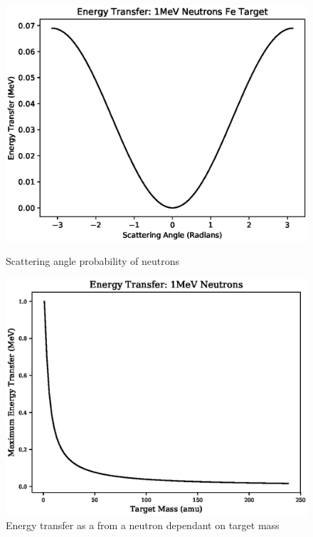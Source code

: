 \begin{figure}
\centering
\begin{minipage}{.46\textwidth}
\centering
\includegraphics[width=.9\linewidth]{chapters/austenitic_steels_in_nuclear/plots/scattering_angle.eps}
\caption{Scattering angle probability of neutrons}
\label{fig:scatteringangle}
\end{minipage}
\begin{minipage}{.05\textwidth}
\end{minipage}
\begin{minipage}{.46\textwidth}
\centering
\includegraphics[width=.9\linewidth]{chapters/austenitic_steels_in_nuclear/plots/nuclei_mass.eps}
\caption{Energy transfer as a from a neutron dependant on target mass}
\label{fig:energytransfer}
\end{minipage}
\end{figure}

